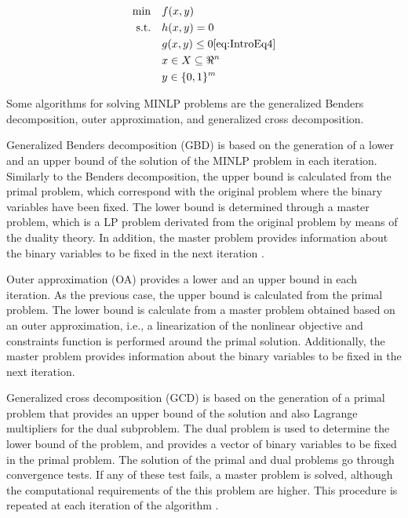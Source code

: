 \begin{refsection}[referencesCh1]
\begin{align}
	\min \quad & f(x,y) \nonumber\\
	\textrm{s.t.} \quad & h(x,y)=0 \nonumber\\
	& g(x,y) \leq 0 \ref{eq:IntroEq4} \\
	& x \in X  \subseteq \Re^{n} \nonumber\\ 
	& y \in \lbrace 0,1 \rbrace ^{m} \nonumber
\end{align}  

Some algorithms for solving MINLP problems are the generalized Benders decomposition, outer approximation, and generalized cross decomposition. 

Generalized Benders decomposition (GBD) is based on the generation of a lower and an upper bound of the solution of the MINLP problem in each iteration. Similarly to the Benders decomposition, the upper bound is calculated from the primal problem, which correspond with the original problem where the binary variables have been fixed. The lower bound is determined through a master problem, which is a LP problem derivated from the original problem by means of the duality theory.  In addition, the master problem provides
information about the binary variables to be fixed in the next iteration \citep{floudas1995nonlinear}.

Outer approximation (OA) provides a lower and an upper bound in each iteration. As the previous case, the upper bound is calculated from the primal problem. The lower bound is calculate from a master problem obtained based on an outer approximation, i.e., a linearization of the nonlinear objective and constraints function is performed around the primal solution. Additionally, the master problem provides information about the binary variables to be fixed in the next iteration.

Generalized cross decomposition (GCD) is based on the generation of a primal problem that provides an upper bound of the solution and also Lagrange multipliers for the dual subproblem. The dual problem is used to determine the lower bound of the problem, and provides a vector of binary variables to be fixed in the primal problem. The solution of the primal and dual problems go through convergence tests. If any of these test fails, a master problem is solved, although the computational requirements of the this problem are higher. This procedure is repeated at each iteration of the algorithm \citep{floudas1995nonlinear}.


\end{refsection}
